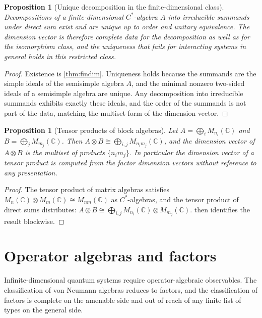\documentclass[11pt,letterpaper]{article}
\newtheorem{proposition}[theorem]{Proposition}
\theoremstyle{definition}
\theoremstyle{remark}
\begin{document}
\begin{proposition}[Unique decomposition in the finite-dimensional class]
\label{prop:unique}
Decompositions of a finite-dimensional $C^*$-algebra $A$ into irreducible summands under direct sum exist and are unique up to order and unitary equivalence. The dimension vector is therefore complete data for the decomposition as well as for the isomorphism class, and the uniqueness that fails for interacting systems in general holds in this restricted class.
\end{proposition}

\begin{proof}
Existence is \cref{thm:findim}. Uniqueness holds because the summands are the simple ideals of the semisimple algebra $A$, and the minimal nonzero two-sided ideals of a semisimple algebra are unique. Any decomposition into irreducible summands exhibits exactly these ideals, and the order of the summands is not part of the data, matching the multiset form of the dimension vector.
\end{proof}

\begin{proposition}[Tensor products of block algebras]
\label{prop:tensor}
Let $A = \bigoplus_i M_{n_i}(\mathbb{C})$ and $B = \bigoplus_j M_{m_j}(\mathbb{C})$. Then $A \otimes B \cong \bigoplus_{i,j} M_{n_i m_j}(\mathbb{C})$, and the dimension vector of $A \otimes B$ is the multiset of products $\{n_i m_j\}$. In particular the dimension vector of a tensor product is computed from the factor dimension vectors without reference to any presentation.
\end{proposition}

\begin{proof}
The tensor product of matrix algebras satisfies $M_n(\mathbb{C}) \otimes M_m(\mathbb{C}) \cong M_{nm}(\mathbb{C})$ as $C^*$-algebras, and the tensor product of direct sums distributes: $A \otimes B \cong \bigoplus_{i,j} M_{n_i}(\mathbb{C}) \otimes M_{m_j}(\mathbb{C})$.  then identifies the result blockwise.
\end{proof}

\section{Operator algebras and factors}
\label{sec:factors}

Infinite-dimensional quantum systems require operator-algebraic observables. The classification of von Neumann algebras reduces to factors, and the classification of factors is complete on the amenable side and out of reach of any finite list of types on the general side.
\end{document}

